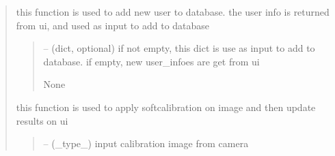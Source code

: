 \documentclass[letterpaper,10pt,english]{sphinxmanual}
\begin{document}
\begin{quote}
\begin{savenotes}
\begin{fulllineitems}
\begin{savenotes}
\begin{fulllineitems}
\end{fulllineitems}\end{savenotes}


\begin{savenotes}\begin{fulllineitems}
\label{\detokenize{setting/setting_api:oxin.setting_api.API.add_user}}
\pysigstartsignatures
{}
\pysigstopsignatures
\sphinxAtStartPar
this function is used to add new user to database.
the user info is returned from ui, and used as input to add to database
\begin{quote}\begin{description}
\sphinxAtStartPar
{} – (dict, optional) if not empty, this dict is use as input to add to database. if empty, new user\_infoes are get
from ui

\sphinxAtStartPar
None

\end{description}\end{quote}

\end{fulllineitems}\end{savenotes}


\begin{savenotes}\begin{fulllineitems}
\label{\detokenize{setting/setting_api:oxin.setting_api.API.apply_calibration_on_image}}
\pysigstartsignatures
{}
\pysigstopsignatures
\sphinxAtStartPar
this function is used to apply soft\sphinxhyphen{}calibration on image and then update results on ui
\begin{quote}\begin{description}
\sphinxAtStartPar
{} – (\_type\_) input calibration image from camera


\end{description}
\end{quote}
\end{fulllineitems}
\end{savenotes}
\end{fulllineitems}
\end{savenotes}
\end{quote}
\end{document}
